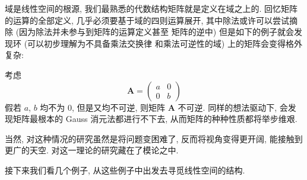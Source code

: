 \documentclass[UTF8]{book}
\begin{document}
域是线性空间的根源, 我们最熟悉的代数结构矩阵就是定义在域之上的. 
回忆矩阵的运算的全部定义, 几乎必须要基于域的四则运算展开, 
其中除法或许可以尝试摘除 (因为除法并未参与到矩阵的运算定义甚至
矩阵的逆中) 但是如下的例子就会发现环 (可以初步理解为不具备乘法交换律
和乘法可逆性的域) 上的矩阵会变得格外复杂: 

考虑 
$$ \boldsymbol{A} = 
\begin{pmatrix}
    a  &  0 \\
    0  &  b 
\end{pmatrix}
$$
假若 $a$, $b$ 均不为 0, 但是又均不可逆, 则矩阵 $\boldsymbol{A}$ 
不可逆. 同样的想法驱动下, 会发现矩阵最根本的 Gauss 消元法都进行不下去, 
从而矩阵的种种性质都将举步维艰. 

当然, 对这种情况的研究虽然是将问题变困难了, 反而将视角变得更开阔, 
能接触到更广的天空. 对这一理论的研究藏在了模论之中. 

接下来我们看几个例子, 从这些例子中出发去寻觅线性空间的结构. 
\end{document}
